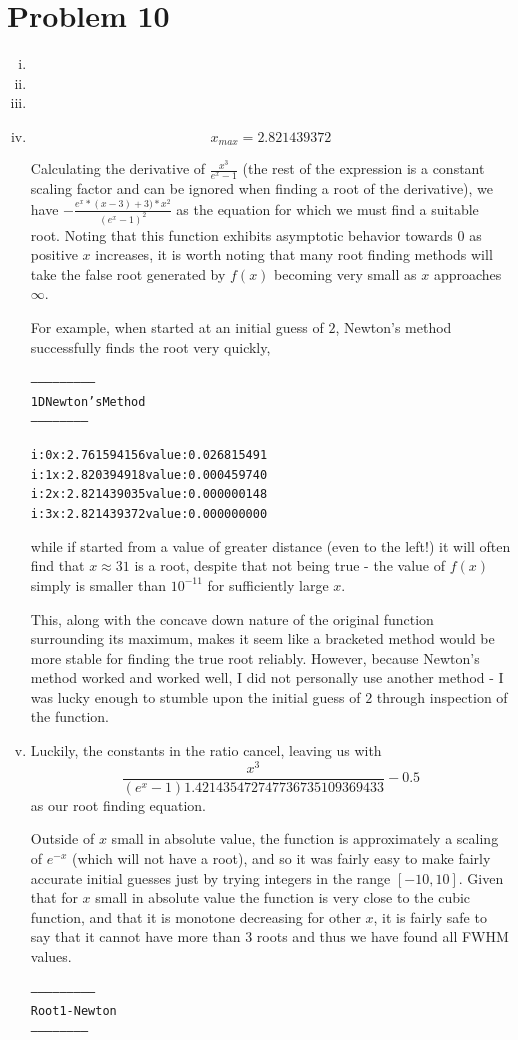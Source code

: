 \documentclass[11pt]{article} %
\begin{document}
\section*{Problem 10}
\begin{enumerate}[i.)]
\item

\item
\item
\item
$$x_{max} = 2.821439372$$
\par Calculating the derivative of $\frac{x^3}{e^x-1}$ (the rest of the expression is a constant scaling factor and can be ignored when finding a root of the derivative), we have $-\frac{e^x*(x-3)+3)*x^2}{(e^x-1)^2}$ as the equation for which we must find a suitable root. Noting that this function exhibits asymptotic behavior towards 0 as positive $x$ increases, it is worth noting that many root finding methods will take the false root generated by $f(x)$ becoming very small as $x$ approaches $\infty$.
\par For example, when started at an initial guess of $2$, Newton's method successfully finds the root very quickly,
\begin{alltt}
--------------------------
 1D Newton's Method
 -----------------------


i: 0	x: 2.761594156	value: 0.026815491
i: 1	x: 2.820394918	value: 0.000459740
i: 2	x: 2.821439035	value: 0.000000148
i: 3	x: 2.821439372	value: 0.000000000
\end{alltt}
while if started from a value of greater distance (even to the left!) it will often find that $x \approx 31$ is a root, despite that not being true - the value of $f(x)$ simply is smaller than $10^{-11}$ for sufficiently large $x$.
\par This, along with the concave down nature of the original function surrounding its maximum, makes it seem like a bracketed method would be more stable for finding the true root reliably. However, because Newton's method worked and worked well, I did not personally use another method - I was lucky enough to stumble upon the initial guess of $2$ through inspection of the function.
\item 
Luckily, the constants in the ratio cancel, leaving us with $$\frac{x^3}{(e^x-1)1.421435472747736735109369433}-0.5$$
 as our root finding equation.
\par Outside of $x$  small in absolute value, the function is approximately a scaling of $e^{-x}$ (which will not have a root), and so it was fairly easy to make fairly accurate initial guesses just by trying integers in the range $[-10,10]$. Given that for $x$ small in absolute value the function is very close to the cubic function, and that it is monotone decreasing for other $x$, it is fairly safe to say that it cannot have more than 3 roots and thus we have found all FWHM values.
\begin{alltt}
--------------------------
 Root 1 - Newton
 -----------------------



\end{alltt}
\end{enumerate}
\end{document}
